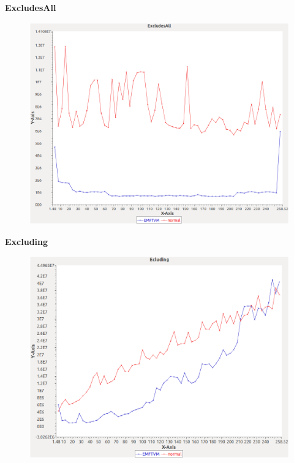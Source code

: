 \noindent\textbf{ExcludesAll}

\begin{figure}[h]
\centering
\includegraphics[width=\textwidth]{graphs/bag/ExcludesAll}
\end{figure}
\pagebreak

\noindent\textbf{Excluding}

\begin{figure}[h]
\centering
\includegraphics[width=\textwidth]{graphs/bag/Excluding}
\end{figure}
\pagebreak


